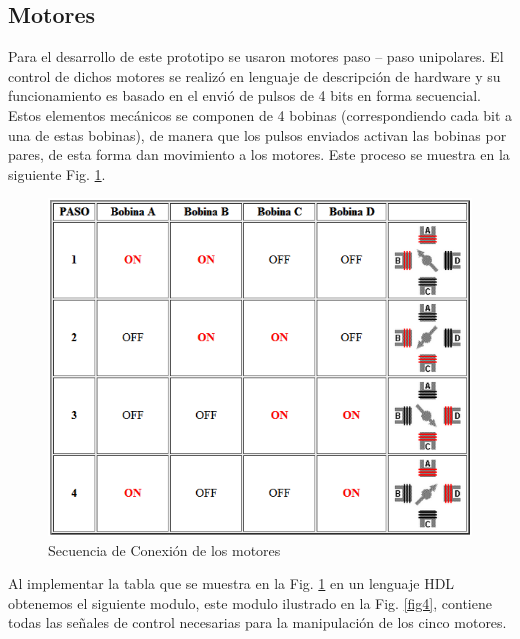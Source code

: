 \documentclass[twocolumn]{IEEEtran}
\begin{document}
\subsection{Motores}
\noindent
Para el desarrollo de este prototipo se usaron motores paso – paso unipolares. El control de dichos motores se realizó en lenguaje de descripción de hardware y su funcionamiento es basado en el envió de  pulsos de 4 bits en forma secuencial. Estos elementos mecánicos se componen de 4 bobinas (correspondiendo cada bit a una de estas bobinas), de manera que los pulsos enviados activan  las bobinas por pares, de esta forma dan movimiento a los motores. Este proceso se muestra en la siguiente Fig. \ref{fig3}.
\begin{figure}[H]
	\centering
		\includegraphics[scale=0.4]{secuence.png}
	\caption{Secuencia de Conexión de los motores}
	\label{fig3}
\end{figure}
\noindent
Al implementar la tabla que se muestra en la Fig. \ref{fig3} en un lenguaje HDL obtenemos el siguiente modulo, este modulo ilustrado en la Fig. \ref{fig4}, contiene todas las señales de control necesarias para la manipulación de los cinco motores.
\end{document}
